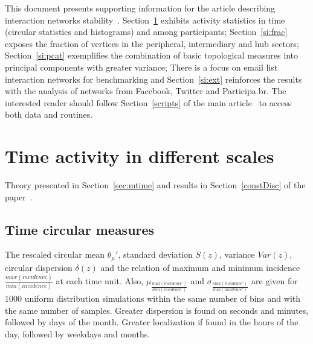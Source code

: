 \documentclass[%
 aip,
 jmp,%
 amsmath,amssymb,
 reprint,%
 floatfix,
]{revtex4-1}
\begin{document}


\date{\today}%

\maketitle

\tableofcontents


\vfill
\newpage

This document presents supporting information for the article describing interaction networks stability~\cite{tpaper}.
Section~\ref{sec:time} exhibits activity statistics in time (circular statistics and histograms) and among participants;
Section~\ref{si:frac} exposes the fraction of vertices in the peripheral, intermediary and hub sectors;
Section~\ref{si:pcat} exemplifies the combination of basic topological measures into principal components with greater variance;
There is a focus on email list interaction networks for benchmarking and
Section~\ref{si:ext} reinforces the results with the analysis of networks from Facebook, Twitter and Participa.br.
The interested reader should follow Section~\ref{scripts} of the main article~\cite{tpaper} to access both data and routines.

\section{Time activity in different scales}\label{sec:time}
Theory presented in Section~\ref{sec:mtime} and results in Section~\ref{constDisc} of the paper~\cite{tpaper}.

\subsection{Time circular measures}\label{si:circ}
The rescaled circular mean $\theta_\mu'$, standard deviation $S(z)$, variance $Var(z)$, circular dispersion $\delta(z)$ and the relation of maximum and minimum incidence $\frac{max(incidence)}{min(incidence)}$ at each time unit.
Also, $ \mu_{\frac{max(incidence')}{min(incidence')}} $ and $ \sigma_{\frac{max(incidence')}{min(incidence')} }$ are given for 1000 uniform distribution simulations within the same number of bins and with the same number of samples. Greater dispersion is found on seconds and minutes, followed
by days of the month. Greater localization if found in the hours of the day, followed by weekdays and months.
\end{document}
